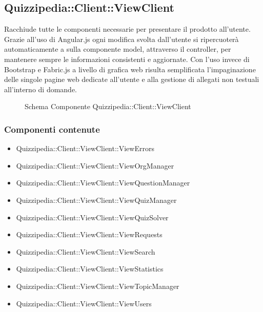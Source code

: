 \subsection{Quizzipedia::Client::ViewClient}
Racchiude tutte le componenti necessarie per presentare il prodotto all'utente.
Grazie all'uso di Angular.js ogni modifica svolta dall'utente si ripercuoterà automaticamente a sulla componente model, attraverso il controller, per mantenere sempre le informazioni consistenti e aggiornate.
Con l'uso invece di Bootstrap e Fabric.js a livello di grafica web risulta semplificata l'impaginazione delle singole pagine web dedicate all'utente e alla gestione di allegati non testuali all'interno di domande.
\begin{figure}[H]
\centering
\noindent{}
\caption[Schema Componente Quizzipedia::Client::ViewClient]{Schema Componente Quizzipedia::Client::ViewClient}
\end{figure}
\subsubsection{Componenti contenute}
\begin{itemize}
\item Quizzipedia::Client::ViewClient::ViewErrors
\item Quizzipedia::Client::ViewClient::ViewOrgManager
\item Quizzipedia::Client::ViewClient::ViewQuestionManager
\item Quizzipedia::Client::ViewClient::ViewQuizManager
\item Quizzipedia::Client::ViewClient::ViewQuizSolver
\item Quizzipedia::Client::ViewClient::ViewRequests
\item Quizzipedia::Client::ViewClient::ViewSearch
\item Quizzipedia::Client::ViewClient::ViewStatistics
\item Quizzipedia::Client::ViewClient::ViewTopicManager
\item Quizzipedia::Client::ViewClient::ViewUsers
\end{itemize}
